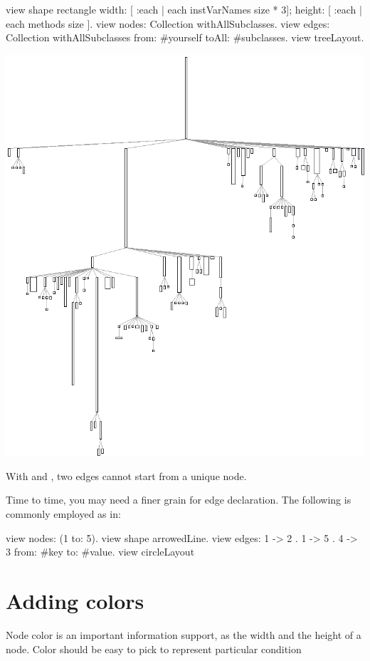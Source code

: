 \documentclass[a4paper,10pt,twoside]{book}
\begin{document}
\begin{code}{}
view shape rectangle
  width: [ :each | each instVarNames size * 3];
  height: [ :each | each methods size ].
view nodes: Collection withAllSubclasses.
view edges: Collection withAllSubclasses from: #yourself toAll: #subclasses.
view treeLayout.
\end{code}
\begin{center}\includegraphics[scale=0.4]{picture6}\end{center}


With  and , two edges cannot start from a unique node.

Time to time, you may need a finer grain for edge declaration. The following is commonly employed as in:

\begin{code}{}
view nodes: (1 to: 5). 
view shape arrowedLine. 
view edges: { 1 -> 2 . 1 -> 5 . 4 -> 3 } from: #key to: #value. 
view circleLayout
\end{code}

\section{Adding colors}
Node color is an important information support, as the width and the height of a node. Color should be easy to pick to represent particular condition
\end{document}
